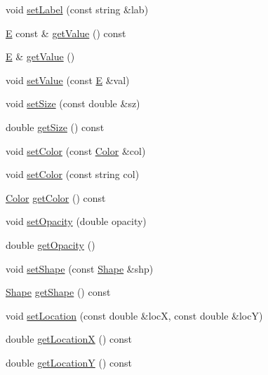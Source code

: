 \begin{DoxyCompactItemize}
\item 
void \mbox{\hyperlink{classbridges_1_1_element_a22313b74452175d07650168a701daa99}{set\+Label}} (const string \&lab)
\item 
\mbox{\hyperlink{namespacebridges_acfb0a4f7877d8f63de3e6862004c50eda3a3ea00cfc35332cedf6e5e9a32e94da}{E}} const  \& \mbox{\hyperlink{classbridges_1_1_element_a9d32bb23420c0ec61684c79964fa14b0}{get\+Value}} () const
\item 
\mbox{\hyperlink{namespacebridges_acfb0a4f7877d8f63de3e6862004c50eda3a3ea00cfc35332cedf6e5e9a32e94da}{E}} \& \mbox{\hyperlink{classbridges_1_1_element_aef73562aef54dd132d779104800e5ed5}{get\+Value}} ()
\item 
void \mbox{\hyperlink{classbridges_1_1_element_a737cb19281b6aa45a5a1dc9d592dad93}{set\+Value}} (const \mbox{\hyperlink{namespacebridges_acfb0a4f7877d8f63de3e6862004c50eda3a3ea00cfc35332cedf6e5e9a32e94da}{E}} \&val)
\item 
void \mbox{\hyperlink{classbridges_1_1_element_a8342cb6785b146f944701468ef094ea2}{set\+Size}} (const double \&sz)
\item 
double \mbox{\hyperlink{classbridges_1_1_element_ac3ffb20f3bdc01696130ab0cb141277f}{get\+Size}} () const
\item 
void \mbox{\hyperlink{classbridges_1_1_element_a0bb9291a0217ab222386572f76bb294c}{set\+Color}} (const \mbox{\hyperlink{classbridges_1_1_color}{Color}} \&col)
\item 
void \mbox{\hyperlink{classbridges_1_1_element_a7c3a0f9fb1c370e4ade6656491343522}{set\+Color}} (const string col)
\item 
\mbox{\hyperlink{classbridges_1_1_color}{Color}} \mbox{\hyperlink{classbridges_1_1_element_ad6725703e86f04f169bc63f4e3a714d0}{get\+Color}} () const
\item 
void \mbox{\hyperlink{classbridges_1_1_element_abbb625dd5a6ce4b855d558ce8fe70a47}{set\+Opacity}} (double opacity)
\item 
double \mbox{\hyperlink{classbridges_1_1_element_a71e157e0423b48c777ad3421fae01ee2}{get\+Opacity}} ()
\item 
void \mbox{\hyperlink{classbridges_1_1_element_a6571144f18e101e5ae95ddc019b9732f}{set\+Shape}} (const \mbox{\hyperlink{namespacebridges_a1b4050586bd708782ae0d4f3b06b9579}{Shape}} \&shp)
\item 
\mbox{\hyperlink{namespacebridges_a1b4050586bd708782ae0d4f3b06b9579}{Shape}} \mbox{\hyperlink{classbridges_1_1_element_a03170256f77ef0840cd65e3be9ab3781}{get\+Shape}} () const
\item 
void \mbox{\hyperlink{classbridges_1_1_element_aac1ebe86faf21746aaa3fab407e8e078}{set\+Location}} (const double \&locX, const double \&locY)
\item 
double \mbox{\hyperlink{classbridges_1_1_element_a3b6eae6e2ed5c9d74b9858f23d47e878}{get\+LocationX}} () const
\item 
double \mbox{\hyperlink{classbridges_1_1_element_a55ae0ef486ea19ca951b1604f1abb9df}{get\+LocationY}} () const
\end{DoxyCompactItemize}
